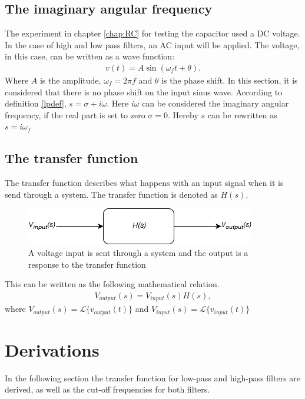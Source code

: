 \subsection{The imaginary angular frequency}
The experiment in chapter \ref{chap:RC} for testing the capacitor used a DC voltage. In the case of high and low pass filters, an AC input will be applied. The voltage, in this case, can be written as a wave function:
\begin{align*}
v(t)=A\sin(\omega_f t+\theta).
\end{align*}
Where $A$ is the amplitude, $\omega_f=2\pi f$ and $\theta$ is the phase shift. In this section, it is considered that there is no phase shift on the input sinus wave. According to definition \ref{lpdef}, $s=\sigma + i \omega$. Here $i \omega$ can be considered the imaginary angular frequency, if the real part is set to zero $\sigma = 0$. Hereby $s$ can be rewritten as $s = i \omega_f$ \cite[p. 733 - 735]{bcircuit9}

\subsection{The transfer function}
The transfer function describes what happens with an input signal when it is send through a system. The transfer function is denoted as $H(s)$.
\\
\begin{figure}[H]
\center
\includegraphics[scale=0.6]{fig/img/transfer_function.png}
\caption{A voltage input is sent through a system and the output is a response to the transfer function}
\label{fig:transfer}
\end{figure}
\noindent
This can be written as the following mathematical relation.
\begin{align*}
V_{output}(s)=V_{input}(s)H(s),
\end{align*}
where $V_{output}(s)=\mathcal{L}\{v_{output}(t)\}$ and $V_{input}(s)=\mathcal{L}\{v_{input}(t)\}$

\section{Derivations} \label{Derivations}
In the following section the transfer function for low-pass and high-pass filters are derived, as well as the cut-off frequencies for both filters.

